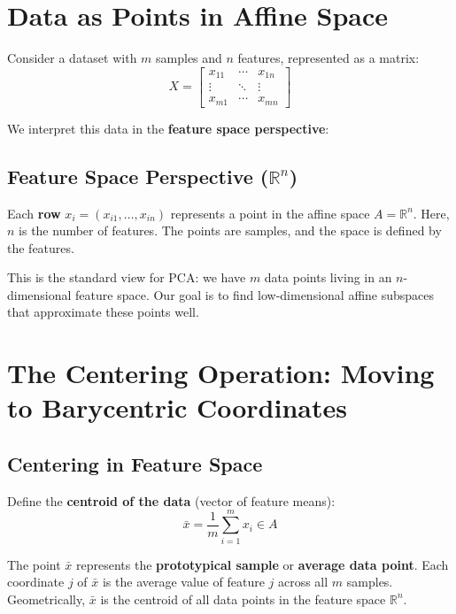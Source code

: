 \begin{notechapter}
\section{Data as Points in Affine Space}

Consider a dataset with $m$ samples and $n$ features, represented as a matrix:
\[
X = \begin{bmatrix}
x_{11} & \cdots & x_{1n} \\
\vdots & \ddots & \vdots \\
x_{m1} & \cdots & x_{mn}
\end{bmatrix}
\]

We interpret this data in the \textbf{feature space perspective}:

\subsection{Feature Space Perspective ($\mathbb{R}^n$)}
Each \textbf{row} $x_i = (x_{i1}, \dots, x_{in})$ represents a point in the affine space $A = \mathbb{R}^n$. Here, $n$ is the number of features. The points are samples, and the space is defined by the features.

\begin{remark}
This is the standard view for PCA: we have $m$ data points living in an $n$-dimensional feature space. Our goal is to find low-dimensional affine subspaces that approximate these points well.
\end{remark}

\section{The Centering Operation: Moving to Barycentric Coordinates}

\subsection{Centering in Feature Space}

Define the \textbf{centroid of the data} (vector of feature means):
\[
\bar{x} = \frac{1}{m}\sum_{i=1}^m x_i \in A
\]

\begin{remark}
The point $\bar{x}$ represents the \textbf{prototypical sample} or \textbf{average data point}. Each coordinate $j$ of $\bar{x}$ is the average value of feature $j$ across all $m$ samples. Geometrically, $\bar{x}$ is the centroid of all data points in the feature space $\mathbb{R}^n$.
\end{remark}


\end{notechapter}

